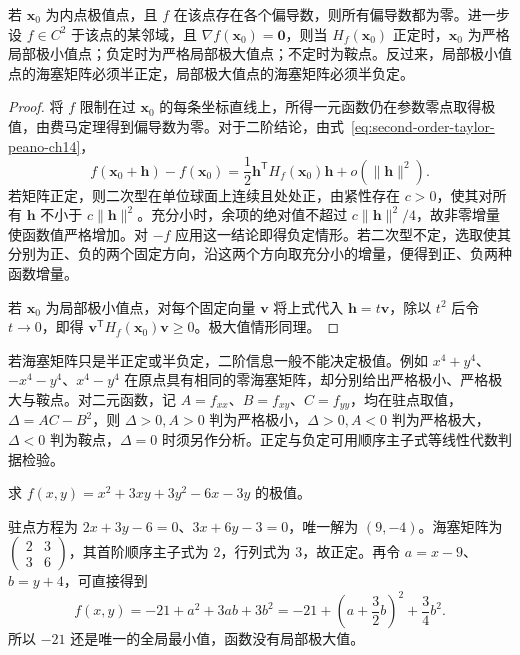 \begin{theorem}[极值的必要条件与二阶判别]
\label{thm:multivariable-extremum-tests-ch14}
若 $\boldsymbol x_0$ 为内点极值点，且 $f$ 在该点存在各个偏导数，则所有偏导数都为零。进一步设 $f\in C^2$ 于该点的某邻域，且 $\nabla f(\boldsymbol x_0)=\boldsymbol0$，则当 $H_f(\boldsymbol x_0)$ 正定时，$\boldsymbol x_0$ 为严格局部极小值点；负定时为严格局部极大值点；不定时为鞍点。反过来，局部极小值点的海塞矩阵必须半正定，局部极大值点的海塞矩阵必须半负定。
\end{theorem}
\begin{proof}
将 $f$ 限制在过 $\boldsymbol x_0$ 的每条坐标直线上，所得一元函数仍在参数零点取得极值，由费马定理得到偏导数为零。对于二阶结论，由式~\eqref{eq:second-order-taylor-peano-ch14}，
\[
    f(\boldsymbol x_0+\boldsymbol h)-f(\boldsymbol x_0)
    =\frac12\boldsymbol h^{\mathsf T}H_f(\boldsymbol x_0)\boldsymbol h
       +o(\|\boldsymbol h\|^2).
\]
若矩阵正定，则二次型在单位球面上连续且处处正，由紧性存在 $c>0$，使其对所有 $\boldsymbol h$ 不小于 $c\|\boldsymbol h\|^2$。充分小时，余项的绝对值不超过 $c\|\boldsymbol h\|^2/4$，故非零增量使函数值严格增加。对 $-f$ 应用这一结论即得负定情形。若二次型不定，选取使其分别为正、负的两个固定方向，沿这两个方向取充分小的增量，便得到正、负两种函数增量。

若 $\boldsymbol x_0$ 为局部极小值点，对每个固定向量 $\boldsymbol v$ 将上式代入 $\boldsymbol h=t\boldsymbol v$，除以 $t^2$ 后令 $t\to0$，即得 $\boldsymbol v^{\mathsf T}H_f(\boldsymbol x_0)\boldsymbol v\geq0$。极大值情形同理。
\end{proof}

若海塞矩阵只是半正定或半负定，二阶信息一般不能决定极值。例如 $x^4+y^4$、$-x^4-y^4$、$x^4-y^4$ 在原点具有相同的零海塞矩阵，却分别给出严格极小、严格极大与鞍点。对二元函数，记 $A=f_{xx}$、$B=f_{xy}$、$C=f_{yy}$，均在驻点取值，$\Delta=AC-B^2$，则 $\Delta>0,A>0$ 判为严格极小，$\Delta>0,A<0$ 判为严格极大，$\Delta<0$ 判为鞍点，$\Delta=0$ 时须另作分析。正定与负定可用顺序主子式等线性代数判据检验。

\begin{example}
\label{ex:quadratic-global-minimum-ch14}
求 $f(x,y)=x^2+3xy+3y^2-6x-3y$ 的极值。
\end{example}
\begin{solve}
驻点方程为 $2x+3y-6=0$、$3x+6y-3=0$，唯一解为 $(9,-4)$。海塞矩阵为 $\begin{pmatrix}2&3\\3&6\end{pmatrix}$，其首阶顺序主子式为 $2$，行列式为 $3$，故正定。再令 $a=x-9$、$b=y+4$，可直接得到
\[
    f(x,y)=-21+a^2+3ab+3b^2
       =-21+\left(a+\frac32b\right)^2+\frac34b^2.
\]
所以 $-21$ 还是唯一的全局最小值，函数没有局部极大值。
\end{solve}

